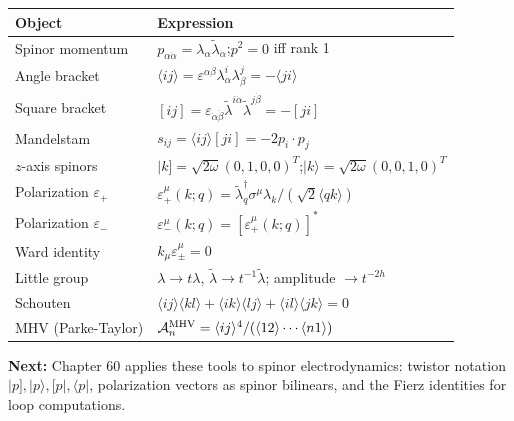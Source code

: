 \begin{center}
\renewcommand{\arraystretch}{1.5}
\begin{tabular}{@{}ll@{}}
  \toprule
  Object & Expression \\
  \midrule
  Spinor momentum & $p_{\alpha\dot\alpha} = \lambda_\alpha\tilde\lambda_{\dot\alpha}$;\quad $p^2=0$ iff rank 1 \\
  Angle bracket & $\langle ij\rangle = \varepsilon^{\alpha\beta}\lambda^i_\alpha\lambda^j_\beta = -\langle ji\rangle$ \\
  Square bracket & $[ij] = \varepsilon_{\dot\alpha\dot\beta}\tilde\lambda^{i\dot\alpha}\tilde\lambda^{j\dot\beta} = -[ji]$ \\
  Mandelstam & $s_{ij} = \langle ij\rangle[ji] = -2p_i\cdot p_j$ \\
  $z$-axis spinors & $|k]=\sqrt{2\omega}(0,1,0,0)^T$;\quad $|k\rangle=\sqrt{2\omega}(0,0,1,0)^T$ \\
  Polarization $\varepsilon_+$ & $\varepsilon_+^\mu(k;q) = \tilde\lambda_q^{\dagger}\sigma^\mu\lambda_k / (\sqrt{2}\langle qk\rangle)$ \\
  Polarization $\varepsilon_-$ & $\varepsilon_-^\mu(k;q) = [\varepsilon_+^\mu(k;q)]^*$ \\
  Ward identity & $k_\mu\varepsilon_\pm^\mu = 0$ \\
  Little group & $\lambda\to t\lambda$,\; $\tilde\lambda\to t^{-1}\tilde\lambda$;\; amplitude $\to t^{-2h}$ \\
  Schouten & $\langle ij\rangle\langle kl\rangle+\langle ik\rangle\langle lj\rangle+\langle il\rangle\langle jk\rangle=0$ \\
  MHV (Parke-Taylor) & $\mathcal{A}_n^{\rm MHV}=\langle ij\rangle^4/(\langle12\rangle\cdots\langle n1\rangle)$ \\
  \bottomrule
\end{tabular}
\end{center}

\bigskip
\noindent\textbf{Next:} Chapter 60 applies these tools to spinor electrodynamics:
twistor notation $|p], |p\rangle, [p|, \langle p|$, polarization vectors as
spinor bilinears, and the Fierz identities for loop computations.
